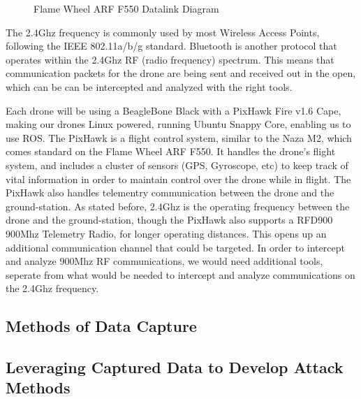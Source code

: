 \documentclass[IEEEtran,letterpaper,10pt,titlepage,draftclsnofoot,onecolumn]{article}
\begin{document}
\begin{figure}[h]
  \caption{Flame Wheel ARF F550 Datalink Diagram}
  \label{fig:datalink_diagram}
\end{figure}

The 2.4Ghz frequency is commonly used by most Wireless Access Points, following the IEEE 802.11a/b/g
standard. Bluetooth is another protocol that operates within the 2.4Ghz RF (radio frequency)
spectrum\cite{HakDaSpectrum}. This means that communication packets for the drone are being sent and received out in the
open, which can be can be intercepted and analyzed with the right tools.

Each drone will be using a BeagleBone Black with a PixHawk Fire v1.6 Cape, making our drones Linux powered, running
Ubuntu Snappy Core, enabling us to use ROS\cite{PixHawk}. The PixHawk is a flight control system, similar to the
Naza M2, which comes standard on the Flame Wheel ARF F550. It handles the drone's flight system, and includes a cluster
of sensors (GPS, Gyroscope, etc) to keep track of vital information in order to maintain control over the drone while
in flight. The PixHawk also handles telementry communication between the drone and the ground-station. As stated before,
2.4Ghz is the operating frequency between the drone and the ground-station, though the PixHawk also supports a RFD900
900Mhz Telemetry Radio, for longer operating distances\cite{PixHawkDocs}. This opens up an additional communication
channel that could be targeted. In order to intercept and analyze 900Mhz RF communications, we would need additional
tools, seperate from what would be needed to intercept and analyze communications on the 2.4Ghz
frequency\cite{HakDaSpectrum900}.

\subsection*{Methods of Data Capture}


\subsection*{Leveraging Captured Data to Develop Attack Methods}


\newpage


\end{document}
